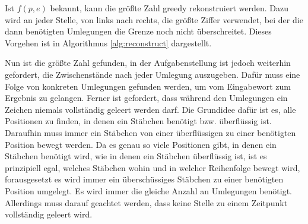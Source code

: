 \documentclass[a4paper,10pt,ngerman]{scrartcl}
\begin{document}
Ist $f(p, e)$ bekannt, kann die größte Zahl greedy rekonstruiert werden. Dazu wird an jeder Stelle, von links nach rechts, die größte Ziffer verwendet, bei der die dann benötigten Umlegungen die Grenze noch nicht überschreitet. Dieses Vorgehen ist in Algorithmus \ref{alg:reconstruct} dargestellt.
Nun ist die größte Zahl gefunden, in der Aufgabenstellung ist jedoch weiterhin gefordert, die Zwischenstände nach jeder Umlegung auszugeben.
Dafür muss eine Folge von konkreten Umlegungen gefunden werden, um vom Eingabewort zum Ergebnis zu gelangen. 
Ferner ist gefordert, dass während den Umlegungen ein Zeichen niemals vollständig geleert werden darf. 
Die Grundidee dafür ist es, alle Positionen zu finden, in denen ein Stäbchen benötigt bzw. überflüssig ist. 
Daraufhin muss immer ein Stäbchen von einer überflüssigen zu einer benötigten Position bewegt werden. 
Da es genau so viele Positionen gibt, in denen ein Stäbchen benötigt wird, wie in denen ein Stäbchen überflüssig ist, ist es prinzipiell egal, welches Stäbchen wohin und in welcher Reihenfolge bewegt wird, forausgesetzt es wird immer ein überschüssiges Stäbchen zu einer benötigten Position umgelegt.
Es wird immer die gleiche Anzahl an Umlegungen benötigt. 
Allerdings muss darauf geachtet werden, dass keine Stelle zu einem Zeitpunkt vollständig geleert wird. 
\end{document}
